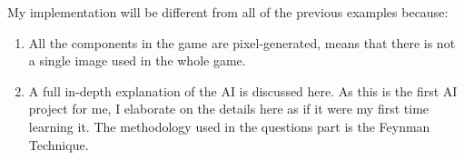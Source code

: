 My implementation will be different from all of the previous examples because:
\begin{enumerate}
\item All the components in the game are pixel-generated, means that there is not a single image used in the whole game.
\item A full in-depth explanation of the AI is discussed here. As this is the first AI project for me, I elaborate on the details here as if it were my first time learning it. The methodology used in the questions part is the Feynman Technique.
\end{enumerate}



